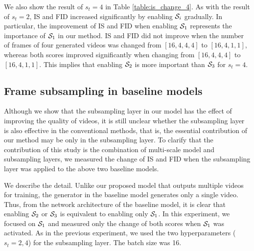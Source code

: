 \documentclass[twocolumn]{svjour3}
\def\Table#1{Table \ref{table:#1}}
\begin{document}
We also show the result of $s_t=4$ in \Table{is_change_4}.
As with the result of $s_t=2$,
IS and FID increased significantly by enabling ${\cal S}_i$ gradually.
In particular, the improvement of IS and FID when enabling ${\cal S}_1$
represents the importance of ${\cal S}_1$ in our method.
IS and FID did not improve when the number of frames of four generated videos
was changed from $[16,4,4,4]$ to $[16,4,1,1]$,
whereas both scores improved significantly
when changing from $[16,4,4,4]$ to $[16,4,1,1]$.
This implies that enabling ${\cal S}_2$ is more important than ${\cal S}_3$ for $s_t=4$.
































\subsection{Frame subsampling in baseline models}













Although we show that the subsampling layer in our model has the effect of improving the quality of videos,
it is still unclear whether the subsampling layer is also effective in the conventional methods,
that is, the essential contribution of our method may be only in the subsampling layer.
To clarify that the contribution of this study is the combination of multi-scale model
and subsampling layers, we measured the change of IS and FID
when the subsampling layer was applied to the above two baseline models.

We describe the detail.
Unlike our proposed model that outputs multiple videos for training,
the generator in the baseline model generates only a single video.
Thus, from the network architecture of the baseline model,
it is clear that enabling ${\cal S}_2$ or ${\cal S}_3$ is equivalent to enabling only ${\cal S}_1$.
In this experiment, we focused on ${\cal S}_1$ and measured only the change of both scores
when ${\cal S}_1$ was activated.
As in the previous experiment, we used the two hyperparameters ($s_t=2, 4$)
for the subsampling layer. The batch size was 16.
\end{document}
